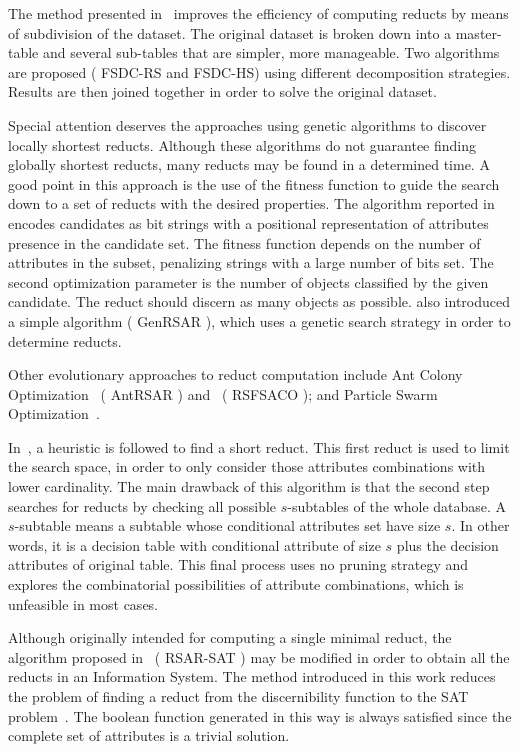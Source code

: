 \documentclass[authoryear,11pt]{elsarticle}
\makeatletter
\newcommand{\setword}[2]{%
  \phantomsection
  #1\def\@currentlabel{\unexpanded{#1}}\label{#2}%
}
\makeatother
\begin{document}
  The method presented in~\citep{Jiao10} improves the efficiency of computing reducts by means of subdivision 
  of the dataset. The original dataset is broken down into a master-table and several sub-tables that are simpler,
  more manageable. Two algorithms are proposed (\setword{FSDC-RS}{FSDCRS} and FSDC-HS) using 
  different decomposition strategies. Results are then joined together in order to solve the original dataset. 
    
  Special attention deserves the approaches using genetic algorithms to discover locally shortest reducts. Although 
  these algorithms do not guarantee finding globally shortest reducts, many reducts may be found in a determined
  time. A good point in this approach is the use of the fitness function to guide the search down to a set of 
  reducts with the desired properties. The algorithm reported in~\citep{Wroblewski95} encodes candidates as bit 
  strings with a positional representation of attributes presence in the candidate set. The fitness function
  depends on the number of attributes in the subset, penalizing strings with a large number of bits set. The 
  second optimization parameter is the number of objects classified by the given candidate. The reduct should 
  discern as many objects as possible. \cite{Jensen03} also introduced a simple algorithm 
  (\setword{GenRSAR}{GenRSAR}), which uses a genetic search strategy in order to determine reducts.
  
  Other evolutionary approaches to reduct computation include Ant Colony Optimization~\citep{Jensen03} 
  (\setword{AntRSAR}{AntRSAR}) and~\citep{Chen10} (\setword{RSFSACO}{RSFSACO}); and Particle Swarm 
  Optimization~\citep{Wang07}.
    
  In~\citep{Lin04}, a heuristic is followed to find a short reduct. This first reduct is used to limit the search
  space, in order to only consider those attributes combinations with lower cardinality. 
  The main drawback of this algorithm is that the second step searches for reducts by checking all possible 
  $s$-subtables of the whole database. A $s$-subtable means a subtable whose conditional attributes set have 
  size $s$. In other words, it is a decision table with conditional attribute of size $s$ plus the decision
  attributes of original table. This final process uses no pruning strategy and explores the combinatorial
  possibilities of attribute combinations, which is unfeasible in most cases.
  
  Although originally intended for computing a single minimal reduct, the algorithm proposed in~\citep{Jensen14}
  (\setword{RSAR-SAT}{RSARSAT}) may be modified in order to obtain all the reducts in an Information System. 
  The method introduced in this work
  reduces the problem of finding a reduct from the discernibility function to the SAT problem~\citep{Davis62}. 
  The boolean function generated in this way is always satisfied since the complete set of attributes is a trivial
  solution.
  
\end{document}
